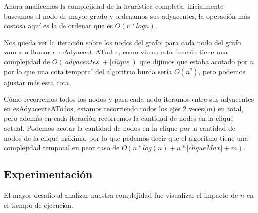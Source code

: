 Ahora analicemos la complejidad de la heurística completa, inicialmente buscamos el nodo de mayor grado y ordenamos sus adyacentes, la operación más costosa aquí es la de ordenar que es $O(n*log n)$.

Nos queda ver la iteración sobre los nodos del grafo: para cada nodo del grafo vamos a llamar a esAdyacenteATodos, como vimos esta función tiene una complejidad de $O(|adyacentes| + |clique|)$ que dijimos que estaba acotado por $n$ por lo que una cota temporal del algoritmo burda sería $O(n^2)$, pero podemos ajustar más esta cota.

Cómo recorremos todos los nodos y para cada nodo iteramos entre sus adyacentes en esAdyacenteATodos, estamos recorriendo todos los ejes 2 veces($m$) en total, pero además en cada iteración recorremos la cantidad de nodos en la clique actual. Podemos acotar la cantidad de nodos en la clique por la cantidad de nodos de la clique máxima, por lo que podemos decir que el algoritmo tiene una complejidad temporal en peor caso de $O( n*log(n) + n*|cliqueMax| + m)$.


\subsection{Experimentación}

El mayor desafío al analizar nuestra complejidad fue visualizar el impacto de $n$ en el tiempo de ejecución.


